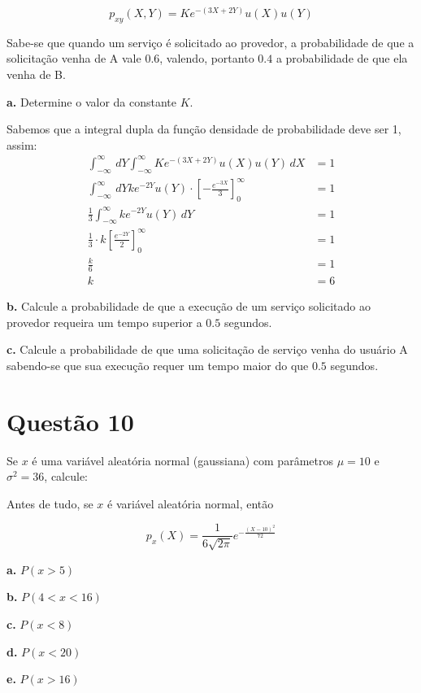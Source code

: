 \documentclass[a5paper]{report}
\begin{document}
\[p_{xy}(X, Y) = Ke^{-(3X + 2Y)}u(X)u(Y)\]

Sabe-se que quando um serviço é solicitado ao provedor, a probabilidade de que
a solicitação venha de A vale $0.6$, valendo, portanto $0.4$ a probabilidade de que ela venha de B.

\textbf{a.} Determine o valor da constante $K$.

Sabemos que a integral dupla da função densidade de probabilidade deve ser 1, assim:
\begin{align*}
	\int_{-\infty}^{\infty} \, dY \int_{-\infty}^{\infty} Ke^{-(3X + 2Y)}u(X)u(Y) \, dX &= 1\\
	\int_{-\infty}^{\infty} \, dY ke^{-2Y} u(Y) \cdot \left[-\frac{e^{-3X}}{3}\right]_{0}^{\infty} &= 1\\
	\frac{1}{3} \int_{-\infty}^{\infty} ke^{-2Y} u(Y) \, dY &= 1\\
	\frac{1}{3} \cdot k \left[\frac{e^{-2Y}}{2}\right]_{0}^{\infty} &= 1\\
	\frac{k}{6} &= 1\\
	k &= 6
\end{align*}

\textbf{b.} Calcule a probabilidade de que a execução de um serviço solicitado ao provedor requeira um tempo superior a $0.5$ segundos.




\textbf{c.} Calcule a probabilidade de que uma solicitação de serviço venha do usuário A sabendo-se que sua execução requer um tempo maior do que $0.5$ segundos.


\section*{Questão 10}
Se $x$ é uma variável aleatória normal (gaussiana) com parâmetros $\mu = 10$ e $\sigma^2 = 36$, calcule:

Antes de tudo, se $x$ é variável aleatória normal, então

\[p_x(X) = \frac{1}{6\sqrt{2\pi}} e^{-\frac{(X - 10)^2}{72}}\]

\textbf{a.} $P(x > 5)$

\textbf{b.} $P(4 < x< 16)$

\textbf{c.} $P(x < 8)$

\textbf{d.} $P(x < 20)$

\textbf{e.} $P(x > 16)$
	
\end{document}

